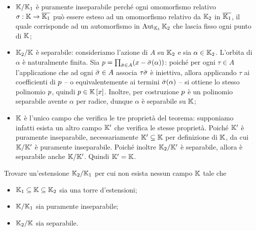 \begin{itemize}
	\item $\FieldExtension{\Field}{\Field_1}$ \`e puramente inseparabile perch\'e ogni omomorfismo relativo $\RelativeHomomorphism: \Field \rightarrow \AlgebraicClosure{\Field_1}$ pu\`o essere esteso ad un omomorfismo relativo da $\Field_2$ in $\AlgebraicClosure{\Field_1}$, il quale corrisponde ad un automorfismo in $\RelativeAutomorphisms{\Field_2}{\Field_1}$ che lascia fisso ogni punto di $\Field$;
	\item $\FieldExtension{\Field_2}{\Field}$ \`e separabile: consideriamo l'azione di $A$ su $\Field_2$ e sia $\alpha \in \Field_2$. L'orbita di $\alpha$ \`e naturalmente finita. Sia $\Polynomial = \prod_{\bar{\RelativeHomomorphism} \in A} (x - \bar{\RelativeHomomorphism}(\alpha))$: poich\'e per ogni $\tau \in A$ l'applicazione che ad ogni $\bar{\RelativeHomomorphism} \in A$ associa $\tau\bar{\RelativeHomomorphism}$ \`e iniettiva, allora applicando $\tau$ ai coefficienti di $\Polynomial$ -- o equivalentemente ai termini $\bar{\RelativeHomomorphism}(\alpha)$ -- si ottiene lo stesso polinomio $\Polynomial$, quindi $\Polynomial \in \RingAdjunction{\Field}{x}$. Inoltre, per costruzione $\Polynomial$ \`e un polinomio separabile avente $\alpha$ per radice, dunque $\alpha$ \`e separabile su $\Field$;
	\item $\Field$ \`e l'unico campo che verifica le tre propriet\`a del teorema: supponiamo infatti esista un altro campo $\Field'$ che verifica le stesse propriet\`a. Poich\'e $\Field'$ \`e puramente inseparabile, necessariamente $\Field' \subseteq \Field$ per definizione di $\Field$, da cui $\FieldExtension{\Field}{\Field'}$ \`e puramente inseparabile. Poich\'e inoltre $\FieldExtension{\Field_2}{\Field'}$ \`e separabile, allora \`e separabile anche $\FieldExtension{\Field}{\Field'}$. Quindi $\Field' = \Field$. \EndProof
\end{itemize}
\begin{Exercice}
	Trovare un'estensione $\FieldExtension{\Field_2}{\Field_1}$ per cui non esista nessun campo $\Field$ tale che
	\begin{itemize}
		\item $\Field_1 \subseteq \Field \subseteq \Field_2$ sia una torre d'estensioni;
		\item $\FieldExtension{\Field}{\Field_1}$ sia puramente inseparabile;
		\item $\FieldExtension{\Field_2}{\Field}$ sia separabile.
	\end{itemize}
\end{Exercice}
